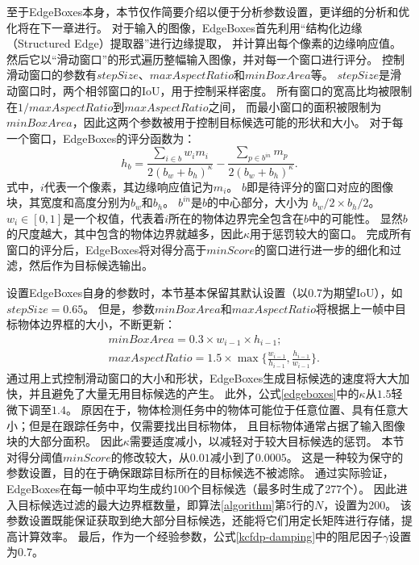 至于EdgeBoxes本身，本节仅作简要介绍以便于分析参数设置，更详细的分析和优化将在下一章进行。
对于输入的图像，EdgeBoxes首先利用``结构化边缘（Structured Edge）提取器''进行边缘提取，
并计算出每个像素的边缘响应值。
然后它以``滑动窗口''的形式遍历整幅输入图像，并对每一个窗口进行评分。
控制滑动窗口的参数有$stepSize$、$maxAspectRatio$和$minBoxArea$等。
$stepSize$是滑动窗口时，两个相邻窗口的IoU，用于控制采样密度。
所有窗口的宽高比均被限制在$1/maxAspectRatio$到$maxAspectRatio$之间，
而最小窗口的面积被限制为$minBoxArea$，因此这两个参数被用于控制目标候选可能的形状和大小。
对于每一个窗口，EdgeBoxes的评分函数为：
\begin{equation}
	h_b = \frac{\sum_{i\in b}w_{i}m_i}{2(b_w+b_h)^\kappa} - \frac{\sum_{p\in b^{in}}m_p}{2(b_w+b_h)^\kappa}. \label{edgeboxes}
\end{equation}
式中，$i$代表一个像素，其边缘响应值记为$m_i$。
$b$即是待评分的窗口对应的图像块，其宽度和高度分别为$b_w$和$b_h$。
$b^{in}$是$b$的中心部分，大小为 ${b_w}/{2}\times {b_h}/{2}$。
$w_{i}\in [0,1]$是一个权值，代表着$i$所在的物体边界完全包含在$b$中的可能性。
显然$b$的尺度越大，其中包含的物体边界就越多，因此$\kappa$用于惩罚较大的窗口。
完成所有窗口的评分后，EdgeBoxes将对得分高于$minScore$的窗口进行进一步的细化和过滤，然后作为目标候选输出。

设置EdgeBoxes自身的参数时，本节基本保留其默认设置（以0.7为期望IoU），如$stepSize=0.65$。
但是，参数$minBoxArea$和$maxAspectRatio$将根据上一帧中目标物体边界框的大小，不断更新：
\begin{equation}
\begin{aligned}
	&minBoxArea=0.3\times w_{i-1}\times h_{i-1};\\
	&maxAspectRatio=1.5\times \max\{\frac{w_{i-1}}{h_{i-1}},\frac{h_{i-1}}{w_{i-1}}\}.
	\label{EBfactor}
\end{aligned}
\end{equation}
通过用上式控制滑动窗口的大小和形状，EdgeBoxes生成目标候选的速度将大大加快，并且避免了大量无用目标候选的产生。
此外，公式\ref{edgeboxes}中的$\kappa$从$1.5$轻微下调至$1.4$。
原因在于，物体检测任务中的物体可能位于任意位置、具有任意大小；但是在跟踪任务中，仅需要找出目标物体，
且目标物体通常占据了输入图像块的大部分面积。
因此$\kappa$需要适度减小，以减轻对于较大目标候选的惩罚。
本节对得分阈值$minScore$的修改较大，从$0.01$减小到了$0.0005$。
这是一种较为保守的参数设置，目的在于确保跟踪目标所在的目标候选不被滤除。
通过实际验证，EdgeBoxes在每一帧中平均生成约100个目标候选（最多时生成了277个）。
因此进入目标候选过滤的最大边界框数量，即算法\ref{algorithm}第5行的$N$，设置为200。
该参数设置既能保证获取到绝大部分目标候选，还能将它们用定长矩阵进行存储，提高计算效率。
最后，作为一个经验参数，公式\ref{kcfdp-damping}中的阻尼因子$\gamma$设置为0.7。

